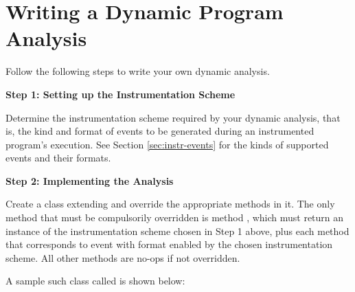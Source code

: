 \section{Writing a Dynamic Program Analysis}
\label{sec:writing-dynamic-analysis}

Follow the following steps to write your own dynamic analysis.

{\bf Step 1: Setting up the Instrumentation Scheme}

Determine the instrumentation scheme required by your dynamic analysis, that is,
the kind and format of events to be generated during an instrumented program's
execution. See Section \ref{sec:instr-events} 
for the kinds of supported events and their formats.

{\bf Step 2: Implementing the Analysis}

Create a class extending  and override
the appropriate methods in it.
The only method that must be compulsorily overridden is method ,
which must return an instance of the instrumentation scheme chosen in Step 1 above,
plus each  method that corresponds to event 
with format  enabled by the chosen instrumentation scheme.
All other methods are no-ops if not overridden.

A sample such class called  is shown below:

